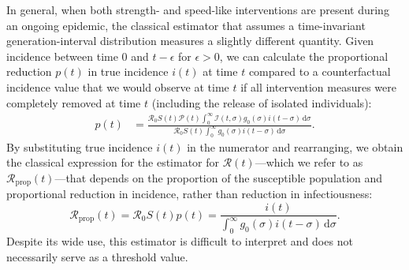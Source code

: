 \documentclass[12pt]{article}
\newcommand{\Rx}[1]{\ensuremath{{\mathcal R}_{#1}}\xspace}
\newcommand{\Ro}{\Rx{0}}
\newcommand{\RR}{\ensuremath{{\mathcal R}}\xspace}
\newcommand{\Rprop}{\Rx{\mathrm{prop}}}
\newcommand{\dd}[1]{\ensuremath{\, \mathrm{d}#1}}
\newcommand{\dsigma}{\dd{\sigma}}
\newcommand{\PP}{{\mathcal P}}
\newcommand{\II}{\ensuremath{\mathcal I}}
\begin{document}
In general, when both strength- and speed-like interventions are present during an ongoing epidemic, the classical estimator that assumes a time-invariant generation-interval distribution measures a slightly different quantity.
Given incidence between time $0$ and $t-\epsilon$ for $\epsilon > 0$, we can calculate the proportional reduction $p(t)$ in true incidence $i(t)$ at time $t$ compared to a counterfactual incidence value that we would observe at time $t$ if all intervention measures were completely removed at time $t$ (including the release of isolated individuals):
\begin{align}
p(t) &= \frac{\Ro S(t) \PP(t) \int_0^\infty \II(t, \sigma) g_0(\sigma) i(t-\sigma)\dsigma}{\Ro S(t) \int_0^\infty g_0(\sigma) i(t-\sigma) \dsigma}.
\end{align}
By substituting true incidence $i(t)$ in the numerator and rearranging, we obtain the classical expression for the estimator for $\RR(t)$---which we refer to as $\Rprop(t)$---that depends on the proportion of the susceptible population and proportional reduction in incidence, rather than reduction in infectiousness:
\begin{equation}
\Rprop(t) = \Ro S(t) p(t) = \frac{i(t)}{\int_0^\infty g_0(\sigma) i(t-\sigma) \dsigma}.
\end{equation}
Despite its wide use, this estimator is difficult to interpret and does not necessarily serve as a threshold value.
\end{document}
